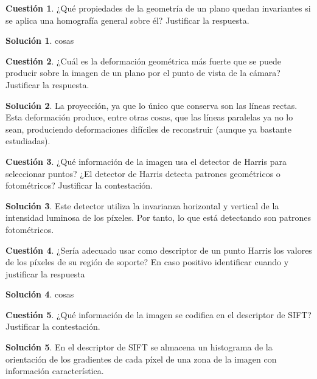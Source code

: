 \documentclass[a4paper, 11pt]{article}
\theoremstyle{definition}
\newtheorem{cuestion}{Cuestión}
\newtheorem*{solucion}{Solución}
\begin{document}
  \begin{cuestion}
    ¿Qué propiedades de la geometría de un plano quedan invariantes si se aplica
    una homografía general sobre él? Justificar la respuesta.
  \end{cuestion}

  \begin{solucion}
    cosas
  \end{solucion}

  \begin{cuestion}
    ¿Cuál es la deformación geométrica más fuerte que se puede producir sobre
    la imagen de un plano por el punto de vista de la cámara? Justificar la respuesta.
  \end{cuestion}

  \begin{solucion}
    La proyección, ya que lo único que conserva son las líneas rectas. Esta deformación
    produce, entre otras cosas, que las líneas paralelas ya no lo sean, produciendo
    deformaciones difíciles de reconstruir (aunque ya bastante estudiadas).
  \end{solucion}


  \begin{cuestion}
    ¿Qué información de la imagen usa el detector de Harris para seleccionar
    puntos? ¿El detector de Harris detecta patrones geométricos o fotométricos?
    Justificar la contestación.
  \end{cuestion}

  \begin{solucion}
     	Este detector utiliza la invarianza horizontal y vertical de la intensidad
      luminosa de los píxeles. Por tanto, lo que está detectando son patrones
      fotométricos.
  \end{solucion}
  \begin{cuestion}
    ¿Sería adecuado usar como descriptor de un punto Harris los valores de
    los píxeles de su región de soporte? En caso positivo identificar cuando y
    justificar la respuesta
  \end{cuestion}

  \begin{solucion}
     	cosas
  \end{solucion}
  \begin{cuestion}
    ¿Qué información de la imagen se codifica en el descriptor de SIFT?
    Justificar la contestación.
  \end{cuestion}

  \begin{solucion}
     	En el descriptor de SIFT se almacena un histograma de la orientación de los
      gradientes de cada píxel de una zona de la imagen con información característica.
  \end{solucion}
\end{document}
